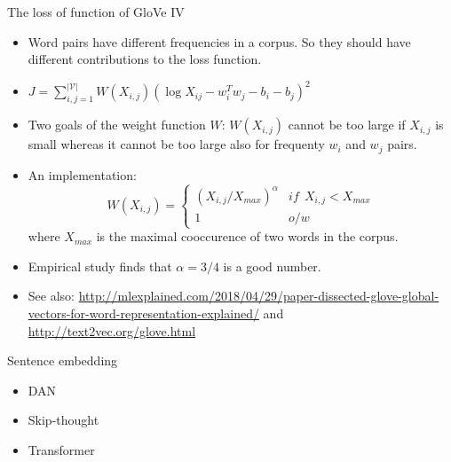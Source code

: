 \documentclass[10pt]{beamer}
\begin{document}
\begin{frame}{The loss of function of GloVe IV}
\begin{itemize}[<+->]
 \item Word pairs have different frequencies in a corpus. So they should have different contributions to the loss function. 
 \item $J = \sum_{i,j= 1}^{|\mathcal{V}|} W(X_{i,j}) (\log X_{ij} - w_i^T w_j - b_i - b_j)^2$
 \item Two goals of the weight function $W$: $W(X_{i,j})$ cannot be too large if $X_{i,j}$ is small whereas it cannot be too large also for frequenty $w_i$ and $w_j$ pairs. 
 \item An implementation: 
 $$W(X_{i,j}) = 
 \begin{cases}
 (X_{i,j} / X_{max})^\alpha & if~~ X_{i,j} < X_{max}\\
 1 & o/w
 \end{cases} $$
 where $X_{max}$ is the maximal cooccurence of two words in the corpus. 
 \item Empirical study finds that $\alpha=3/4$ is a good number. 
  \item See also: \url{http://mlexplained.com/2018/04/29/paper-dissected-glove-global-vectors-for-word-representation-explained/} and \url{http://text2vec.org/glove.html}
\end{itemize}
\end{frame}

\begin{frame}{Sentence embedding}
 \begin{itemize}
  \item DAN
  \item Skip-thought
  \item Transformer 
 \end{itemize}
\end{frame}
\end{document}
